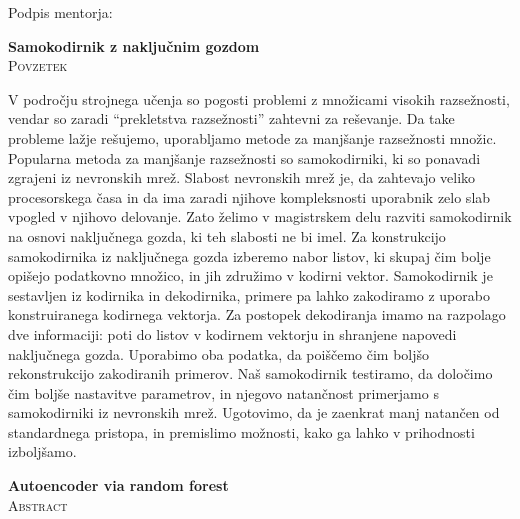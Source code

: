\documentclass[12pt,a4paper,twoside]{article}
\newcommand{\naslovdela}{Samokodirnik z naključnim gozdom}
\theoremstyle{definition} %
\theoremstyle{plain} %
\numberwithin{equation}{section}  %
\begin{document}
\vspace{2cm}
\hspace*{\fill} Podpis mentorja: \phantom{prostor za podpis}


\cleardoublepage
{}

\begin{center}
\textbf{\naslovdela} \\[3mm]
\textsc{Povzetek} \\[2mm]
\end{center}
V področju strojnega učenja so pogosti problemi z množicami visokih razsežnosti, vendar so zaradi ``prekletstva razsežnosti'' zahtevni za reševanje.
Da take probleme lažje rešujemo, uporabljamo metode za manjšanje razsežnosti množic.
Popularna metoda za manjšanje razsežnosti so samokodirniki, ki so ponavadi zgrajeni iz nevronskih mrež.
Slabost nevronskih mrež je, da zahtevajo veliko procesorskega časa in da ima zaradi njihove kompleksnosti uporabnik zelo slab vpogled v njihovo delovanje.
Zato želimo v magistrskem delu razviti samokodirnik na osnovi naključnega gozda, ki teh slabosti ne bi imel.
%
Za konstrukcijo samokodirnika iz naključnega gozda izberemo nabor listov, ki skupaj čim bolje opišejo podatkovno množico, in jih združimo v kodirni vektor.
Samokodirnik je sestavljen iz kodirnika in dekodirnika, primere pa lahko zakodiramo z uporabo konstruiranega kodirnega vektorja.
Za postopek dekodiranja imamo na razpolago dve informaciji: poti do listov v kodirnem vektorju in shranjene napovedi naključnega gozda.
Uporabimo oba podatka, da poiščemo čim boljšo rekonstrukcijo zakodiranih primerov.
%
Naš samokodirnik testiramo, da določimo čim boljše nastavitve parametrov, in njegovo natančnost primerjamo s samokodirniki iz nevronskih mrež.
Ugotovimo, da je zaenkrat manj natančen od standardnega pristopa, in premislimo možnosti, kako ga lahko v prihodnosti izboljšamo.

\vfill
\begin{center}
\textbf{Autoencoder via random forest} \\[3mm] %
\textsc{Abstract}\\[2mm]
\end{center}
\end{document}
